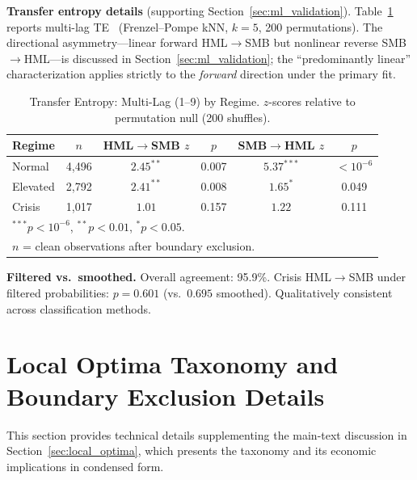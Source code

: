 \documentclass[sigconf,anonymous]{acmart}
\begin{document}
\textbf{Transfer entropy details} (supporting Section~\ref{sec:ml_validation}).
Table~\ref{tab:te} reports multi-lag TE~\cite{schreiber2000measuring,barnett2009granger}
(Frenzel--Pompe kNN, $k=5$, 200 permutations).
The directional asymmetry---linear forward HML$\to$SMB but nonlinear
reverse SMB$\to$HML---is discussed in Section~\ref{sec:ml_validation};
the ``predominantly linear'' characterization applies strictly to the
\emph{forward} direction under the primary fit.

\begin{table}[t]
\centering
\caption{Transfer Entropy: Multi-Lag (1--9) by Regime.
$z$-scores relative to permutation null (200 shuffles).}
\label{tab:te}
\scriptsize
\begin{tabular}{@{}lccccc@{}}
\toprule
Regime & $n$ & HML$\to$SMB $z$ & $p$ & SMB$\to$HML $z$ & $p$ \\
\midrule
Normal & 4,496 & $2.45^{**}$ & 0.007 & $5.37^{***}$ & $< 10^{-6}$ \\
Elevated & 2,792 & $2.41^{**}$ & 0.008 & $1.65^{*}$ & 0.049 \\
Crisis & 1,017 & $1.01$ & 0.157 & $1.22$ & 0.111 \\
\bottomrule
\multicolumn{6}{l}{\footnotesize $^{***}p < 10^{-6}$, $^{**}p < 0.01$, $^{*}p < 0.05$.} \\
\multicolumn{6}{l}{\footnotesize $n$ = clean observations after boundary exclusion.} \\
\end{tabular}
\end{table}

\textbf{Filtered vs.\ smoothed.} Overall agreement: 95.9\%.
Crisis HML$\to$SMB under filtered probabilities: $p = 0.601$ (vs.\ $0.695$ smoothed).
Qualitatively consistent across classification methods.

\section{Local Optima Taxonomy and Boundary Exclusion Details}
\label{app:optima}

This section provides technical details supplementing the main-text discussion in Section~\ref{sec:local_optima},
which presents the taxonomy and its economic implications in condensed form.
\end{document}
